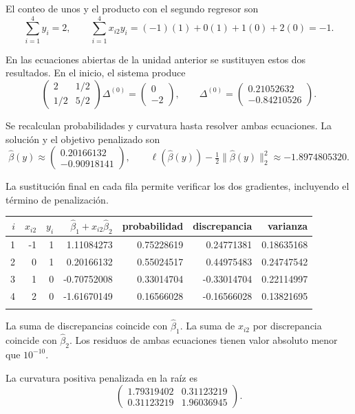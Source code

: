 \documentclass[11pt,a4paper]{article}
\begin{document}
El conteo de unos y el producto con el segundo regresor son
\[
\sum_{i=1}^4 y_i=2,\qquad\sum_{i=1}^4x_{i2}y_i=(-1)(1)+0(1)+1(0)+2(0)=-1.
\]

En las ecuaciones abiertas de la unidad anterior se sustituyen
estos dos resultados. En el inicio, el sistema produce
\[
\begin{pmatrix}2&1/2\\1/2&5/2\end{pmatrix}\Delta^{(0)}=\begin{pmatrix}0\\-2\end{pmatrix},\qquad\Delta^{(0)}=\begin{pmatrix}0.21052632\\-0.84210526\end{pmatrix}.
\]

Se recalculan probabilidades y curvatura hasta resolver
ambas ecuaciones. La solución y el objetivo penalizado son
\[
\widehat\beta(y)\approx\begin{pmatrix}0.20166132\\-0.90918141\end{pmatrix},\qquad \ell(\widehat\beta(y))-\tfrac12\|\widehat\beta(y)\|_2^2\approx-1.8974805320.
\]

La sustitución final en cada fila permite verificar
los dos gradientes, incluyendo el término de penalización.
\begin{center}\scriptsize
\begin{tabular}{rrrrrrr}\toprule
\(i\)&\(x_{i2}\)&\(y_i\)&\(\widehat\beta_1+x_{i2}\widehat\beta_2\)&probabilidad&discrepancia&varianza\\\midrule
1&-1&1&1.11084273&0.75228619&0.24771381&0.18635168\\
2&0&1&0.20166132&0.55024517&0.44975483&0.24747542\\
3&1&0&-0.70752008&0.33014704&-0.33014704&0.22114997\\
4&2&0&-1.61670149&0.16566028&-0.16566028&0.13821695\\
\\\bottomrule\end{tabular}\end{center}
La suma de discrepancias coincide con \(\widehat\beta_1\).
La suma de \(x_{i2}\) por discrepancia coincide con
\(\widehat\beta_2\). Los residuos de ambas ecuaciones
tienen valor absoluto menor que \(10^{-10}\).

La curvatura positiva penalizada en la raíz es
\[
\begin{pmatrix}1.79319402&0.31123219\\0.31123219&1.96036945\end{pmatrix}.
\]
\end{document}
